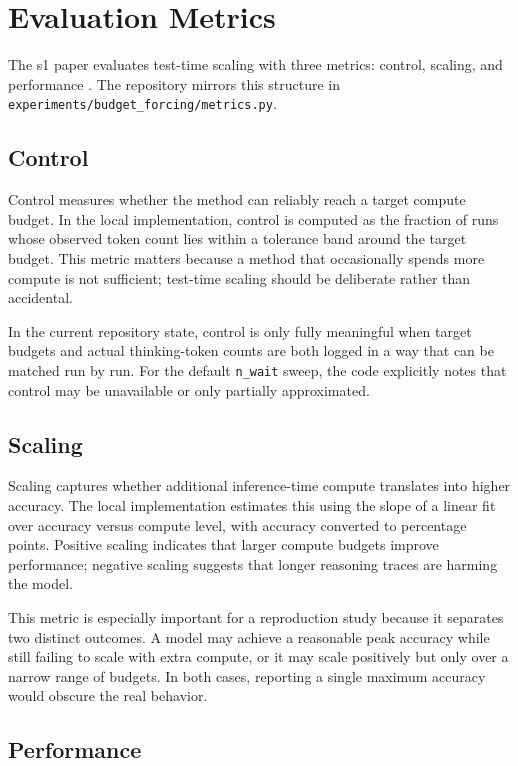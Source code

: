 \section{Evaluation Metrics}\label{sec:metrics}

The s1 paper evaluates test-time scaling with three metrics: control, scaling, and performance \citep{muennighoff2025s1}. The repository mirrors this structure in \texttt{experiments/budget\_forcing/metrics.py}.

\subsection{Control}

Control measures whether the method can reliably reach a target compute budget. In the local implementation, control is computed as the fraction of runs whose observed token count lies within a tolerance band around the target budget. This metric matters because a method that occasionally spends more compute is not sufficient; test-time scaling should be deliberate rather than accidental.

In the current repository state, control is only fully meaningful when target budgets and actual thinking-token counts are both logged in a way that can be matched run by run. For the default \texttt{n\_wait} sweep, the code explicitly notes that control may be unavailable or only partially approximated.

\subsection{Scaling}

Scaling captures whether additional inference-time compute translates into higher accuracy. The local implementation estimates this using the slope of a linear fit over accuracy versus compute level, with accuracy converted to percentage points. Positive scaling indicates that larger compute budgets improve performance; negative scaling suggests that longer reasoning traces are harming the model.

This metric is especially important for a reproduction study because it separates two distinct outcomes. A model may achieve a reasonable peak accuracy while still failing to scale with extra compute, or it may scale positively but only over a narrow range of budgets. In both cases, reporting a single maximum accuracy would obscure the real behavior.

\subsection{Performance}

